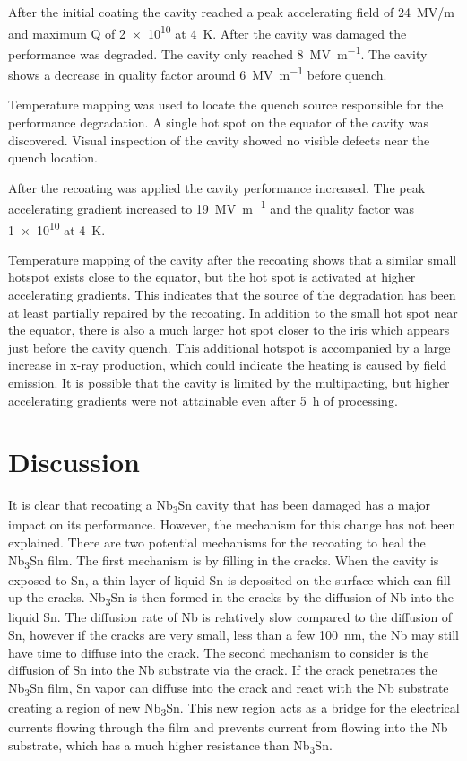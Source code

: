 \documentclass{revtex4-2}
\begin{document}
After the initial coating the cavity reached a peak accelerating field of 24~MV/m and maximum Q of \num{2e10} at \qty{4}{\kelvin}. After the cavity was damaged the performance was degraded. The cavity only reached \qty{8}{\mega\volt\per\meter}. The cavity shows a decrease in quality factor around \qty{6}{\mega\volt\per\meter} before quench.

Temperature mapping was used to locate the quench source responsible for the performance degradation. A single hot spot on the equator of the cavity was discovered. Visual inspection of the cavity showed no visible defects near the quench location.

After the recoating was applied the cavity performance increased. The peak accelerating gradient increased to \qty{19}{\mega\volt\per\meter} and the quality factor was \num{1e10} at \qty{4}{\kelvin}.

Temperature mapping of the cavity after the recoating shows that a similar small hotspot exists close to the equator, but the hot spot is activated at higher accelerating gradients. This indicates that the source of the degradation has been at least partially repaired by the recoating. In addition to the small hot spot near the equator, there is also a much larger hot spot closer to the iris which appears just before the cavity quench. This additional hotspot is accompanied by a large increase in x-ray production, which could indicate the heating is caused by field emission. It is possible that the cavity is limited by the multipacting, but higher accelerating gradients were not attainable even after \qty{5}{\hour} of processing.



\section*{Discussion}
\label{sec:Discussion}

It is clear that recoating a Nb\textsubscript{3}Sn cavity that has been damaged has a major impact on its performance. However, the mechanism for this change has not been explained. There are two potential mechanisms for the recoating to heal the Nb\textsubscript{3}Sn film. The first mechanism is by filling in the cracks. When the cavity is exposed to Sn, a thin layer of liquid Sn is deposited on the surface which can fill up the cracks. Nb\textsubscript{3}Sn is then formed in the cracks by the diffusion of Nb into the liquid Sn. The diffusion rate of Nb is relatively slow compared to the diffusion of Sn, however if the cracks are very small, less than a few \qty{100}{nm}, the Nb may still have time to diffuse into the crack. The second mechanism to consider is the diffusion of Sn into the Nb substrate via the crack. If the crack penetrates the Nb\textsubscript{3}Sn film, Sn vapor can diffuse into the crack and react with the Nb substrate creating a region of new Nb\textsubscript{3}Sn. This new region acts as a bridge for the electrical currents flowing through the film and prevents current from flowing into the Nb substrate, which has a much higher resistance than Nb\textsubscript{3}Sn. 
\end{document}
